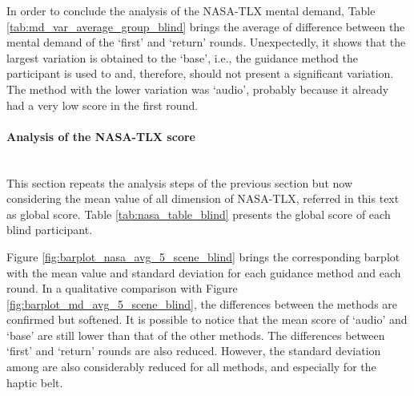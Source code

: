 

In order to conclude the analysis of the NASA-TLX mental demand, Table \ref{tab:md_var_average_group_blind} brings the average of difference between the mental demand of the ‘first’ and ‘return’ rounds. Unexpectedly, it shows that the largest variation is obtained to the ‘base’, i.e., the guidance method the participant is used to and, therefore, should not present a significant variation. The method with the lower variation was ‘audio’, probably because it already had a very low score in the first round. 



\FloatBarrier



\paragraph{Analysis of the NASA-TLX score}\mbox{}\\

This section repeats the analysis steps of the previous section but now considering the mean value of all dimension of NASA-TLX, referred in this text as global score. Table \ref{tab:nasa_table_blind} presents the global score of each blind participant. 



Figure \ref{fig:barplot_nasa_avg_5_scene_blind} brings the corresponding barplot with the mean value and standard deviation for each guidance method and each round. In a qualitative comparison with Figure \ref{fig:barplot_md_avg_5_scene_blind}, the differences between the methods are confirmed but softened. It is possible to notice that the mean score of ‘audio’ and ‘base’ are still lower than that of the other methods. The differences between ‘first’ and ‘return’ rounds are also reduced. However, the standard deviation among are also considerably reduced for all methods, and especially for the haptic belt.

